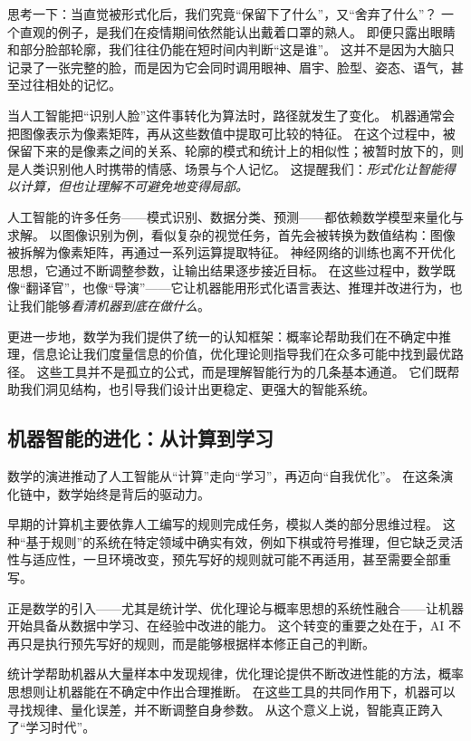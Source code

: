 思考一下：当直觉被形式化后，我们究竟“保留下了什么”，又“舍弃了什么”？  
一个直观的例子，是我们在疫情期间依然能认出戴着口罩的熟人。  
即便只露出眼睛和部分脸部轮廓，我们往往仍能在短时间内判断“这是谁”。  
这并不是因为大脑只记录了一张完整的脸，而是因为它会同时调用眼神、眉宇、脸型、姿态、语气，甚至过往相处的记忆。

当人工智能把“识别人脸”这件事转化为算法时，路径就发生了变化。  
机器通常会把图像表示为像素矩阵，再从这些数值中提取可比较的特征。  
在这个过程中，被保留下来的是像素之间的关系、轮廓的模式和统计上的相似性；被暂时放下的，则是人类识别他人时携带的情感、场景与个人记忆。  
这提醒我们：\emph{形式化让智能得以计算，但也让理解不可避免地变得局部。}  

人工智能的许多任务——模式识别、数据分类、预测——都依赖数学模型来量化与求解。
以图像识别为例，看似复杂的视觉任务，首先会被转换为数值结构：图像被拆解为像素矩阵，再通过一系列运算提取特征。
神经网络的训练也离不开优化思想，它通过不断调整参数，让输出结果逐步接近目标。
在这些过程中，数学既像“翻译官”，也像“导演”——它让机器能用形式化语言表达、推理并改进行为，也让我们能够\emph{看清机器到底在做什么}。  

更进一步地，数学为我们提供了统一的认知框架：概率论帮助我们在不确定中推理，信息论让我们度量信息的价值，优化理论则指导我们在众多可能中找到最优路径。
这些工具并不是孤立的公式，而是理解智能行为的几条基本通道。  
它们既帮助我们洞见结构，也引导我们设计出更稳定、更强大的智能系统。  

\subsection{机器智能的进化：从计算到学习}
数学的演进推动了人工智能从“计算”走向“学习”，再迈向“自我优化”。
在这条演化链中，数学始终是背后的驱动力。

早期的计算机主要依靠人工编写的规则完成任务，模拟人类的部分思维过程。
这种“基于规则”的系统在特定领域中确实有效，例如下棋或符号推理，但它缺乏灵活性与适应性，一旦环境改变，预先写好的规则就可能不再适用，甚至需要全部重写。  

正是数学的引入——尤其是统计学、优化理论与概率思想的系统性融合——让机器开始具备从数据中学习、在经验中改进的能力。  
这个转变的重要之处在于，AI 不再只是执行预先写好的规则，而是能够根据样本修正自己的判断。

统计学帮助机器从大量样本中发现规律，优化理论提供不断改进性能的方法，概率思想则让机器能在不确定中作出合理推断。  
在这些工具的共同作用下，机器可以寻找规律、量化误差，并不断调整自身参数。  
从这个意义上说，智能真正跨入了“学习时代”。

